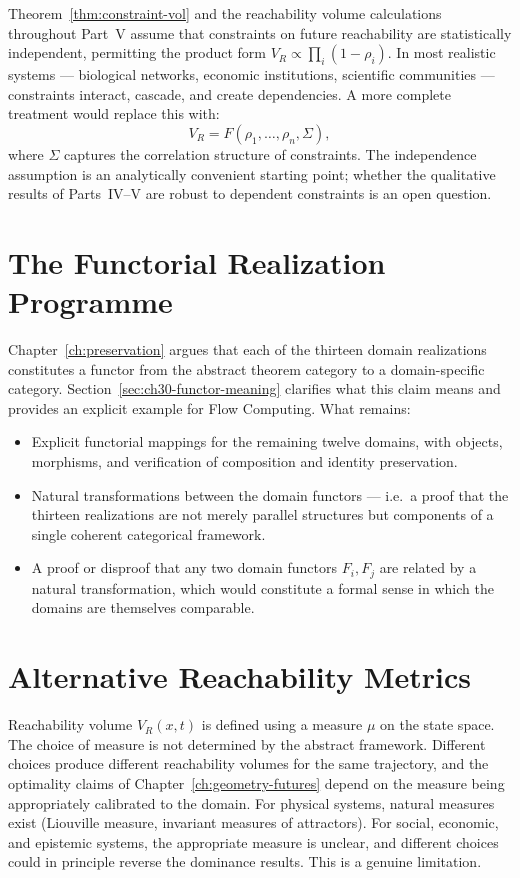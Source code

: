 \documentclass[12pt,twoside,openright]{book}
\begin{document}
Theorem~\ref{thm:constraint-vol} and the reachability
volume calculations throughout Part~V assume that
constraints on future reachability are statistically
independent, permitting the product form
$V_R \propto \prod_i (1 - \rho_i)$. In most realistic
systems --- biological networks, economic institutions,
scientific communities --- constraints interact, cascade,
and create dependencies. A more complete treatment would
replace this with:
\[
  V_R = F(\rho_1, \ldots, \rho_n, \Sigma),
\]
where $\Sigma$ captures the correlation structure of
constraints. The independence assumption is an analytically
convenient starting point; whether the qualitative results
of Parts~IV--V are robust to dependent constraints is an
open question.

\section{The Functorial Realization Programme}

Chapter~\ref{ch:preservation} argues that each of the
thirteen domain realizations constitutes a functor from
the abstract theorem category to a domain-specific
category. Section~\ref{sec:ch30-functor-meaning} clarifies
what this claim means and provides an explicit example for
Flow Computing. What remains:
\begin{itemize}[nosep]
  \item Explicit functorial mappings for the remaining
        twelve domains, with objects, morphisms, and
        verification of composition and identity
        preservation.
  \item Natural transformations between the domain
        functors --- i.e.\ a proof that the thirteen
        realizations are not merely parallel structures but
        components of a single coherent categorical
        framework.
  \item A proof or disproof that any two domain functors
        $F_i, F_j$ are related by a natural transformation,
        which would constitute a formal sense in which the
        domains are themselves comparable.
\end{itemize}

\section{Alternative Reachability Metrics}

Reachability volume $V_R(x,t)$ is defined using a measure
$\mu$ on the state space. The choice of measure is not
determined by the abstract framework. Different choices
produce different reachability volumes for the same
trajectory, and the optimality claims of Chapter~\ref{ch:geometry-futures}
depend on the measure being appropriately calibrated to the
domain. For physical systems, natural measures exist
(Liouville measure, invariant measures of attractors). For
social, economic, and epistemic systems, the appropriate
measure is unclear, and different choices could in principle
reverse the dominance results. This is a genuine limitation.
\end{document}
